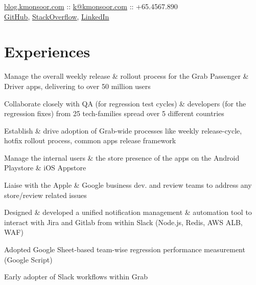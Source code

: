 \documentclass[]{deedy-resume-openfont}
\begin{document}
{ \href{https://blog.kmonsoor.com}{blog.kmonsoor.com}    :: \href{mailto:k@kmonsoor.com}{k@kmonsoor.com}    ::    +65.4567.890\\

   \smallskip
\href{https://github.com/kmonsoor}{\underline{GitHub}}, 
\href{https://stackoverflow.com/story/kmonsoor}{\underline{StackOverflow}},
\href{https://www.linkedin.com/in/kmonsoor}{\underline{LinkedIn}}
}


\smallskip
\smallskip
\section{Experiences}


\begin{tightemize}
\item Manage the overall weekly release \& rollout process for the Grab Passenger \& Driver apps, delivering to over 50 million users
\item Collaborate closely with QA (for regression test cycles) \& developers (for the regression fixes) from 25 tech-families spread over 5 different countries
\item Establish \& drive adoption of Grab-wide processes like weekly release-cycle, hotfix rollout process, common apps release framework
\item Manage the internal users \& the store presence of the apps on the Android Playstore \& iOS Appstore
\item Liaise with the Apple \& Google business dev. and review teams to address any store/review related issues

\end{tightemize}
\smallskip

\begin{tightemize}
	\item Designed \& developed a unified notification management \& automation tool to interact with Jira and Gitlab from within Slack (Node.js, Redis, AWS ALB, WAF)
    \item Adopted Google Sheet-based team-wise regression performance measurement (Google Script)
    \item Early adopter of Slack workflows within Grab

\end{tightemize}
\sectionsep
\end{document}

